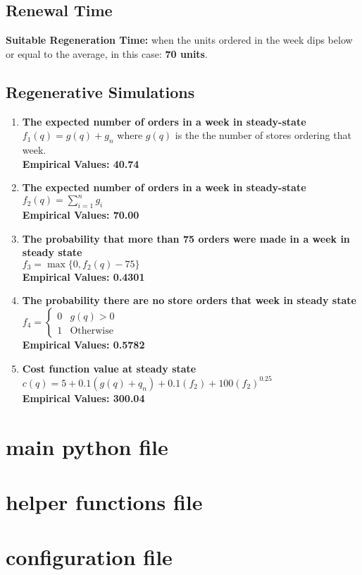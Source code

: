 \documentclass{amsart}
\theoremstyle{definition}
\theoremstyle{remark}
\numberwithin{equation}{section}
\begin{document}
\section{Renewal Time}
\textbf{Suitable Regeneration Time: }when the units ordered in the week dips below or equal to the average, in this case: \textbf{70 units}.

\section{Regenerative Simulations}
\begin{enumerate}
\item \textbf{The expected number of orders in a week in steady-state}\\
$f_1(q)=g(q)+g_n$ where $g(q)$ is the the number of stores ordering that week.\\
\textbf{Empirical Values: 40.74}
\item \textbf{The expected number of orders in a week in steady-state}\\
$f_2(q)=\sum^n_{i=1}g_i$\\
\textbf{Empirical Values: 70.00}
\item \textbf{The probability that more than 75 orders were made in a week in steady state}\\
$f_3=\max\{0,f_2(q)-75\}$\\
\textbf{Empirical Values: 0.4301}
\item \textbf{The probability there are no store orders that week in steady state}\\
$f_4=\left\{\begin{array}{ll}0 & g(q)>0\\1 & \text{Otherwise}\end{array}\right.$\\
\textbf{Empirical Values: 0.5782}
\item\textbf{Cost function value at steady state}
$c(q)= 5+0.1(g(q)+q_n)+0.1(f_2)+100(f_2)^{0.25}$\\
\textbf{Empirical Values: 300.04}
\end{enumerate}

\begin{appendices}
\chapter{main python file}

\chapter{helper functions file}

\chapter{configuration file}\\
\end{appendices}
\end{document}
